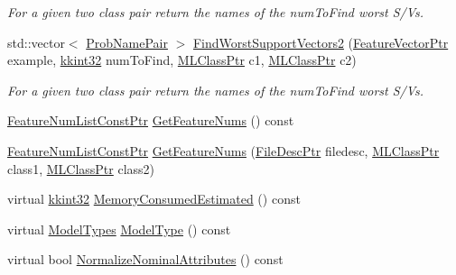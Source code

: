 \begin{DoxyCompactItemize}
\begin{DoxyCompactList}\small\item\em For a given two class pair return the names of the \textquotesingle{}num\+To\+Find\textquotesingle{} worst S/V\textquotesingle{}s. \end{DoxyCompactList}\item 
std\+::vector$<$ \hyperlink{class_k_k_m_l_l_1_1_prob_name_pair}{Prob\+Name\+Pair} $>$ \hyperlink{class_k_k_m_l_l_1_1_model_old_s_v_m_a305e4c27825e5714c3fe4f27b5d65828}{Find\+Worst\+Support\+Vectors2} (\hyperlink{namespace_k_k_m_l_l_a0c5df3d48f45926fbc4fee04f5e3bc04}{Feature\+Vector\+Ptr} example, \hyperlink{namespace_k_k_b_a8fa4952cc84fda1de4bec1fbdd8d5b1b}{kkint32} num\+To\+Find, \hyperlink{namespace_k_k_m_l_l_ac272393853d59e72e8456f14cd6d8c23}{M\+L\+Class\+Ptr} c1, \hyperlink{namespace_k_k_m_l_l_ac272393853d59e72e8456f14cd6d8c23}{M\+L\+Class\+Ptr} c2)
\begin{DoxyCompactList}\small\item\em For a given two class pair return the names of the \textquotesingle{}num\+To\+Find\textquotesingle{} worst S/V\textquotesingle{}s. \end{DoxyCompactList}\item 
\hyperlink{namespace_k_k_m_l_l_a81284b0a14973267260023f9a72da94a}{Feature\+Num\+List\+Const\+Ptr} \hyperlink{class_k_k_m_l_l_1_1_model_old_s_v_m_a29723967e3ebb4aa1f08532b54aaf584}{Get\+Feature\+Nums} () const 
\item 
\hyperlink{namespace_k_k_m_l_l_a81284b0a14973267260023f9a72da94a}{Feature\+Num\+List\+Const\+Ptr} \hyperlink{class_k_k_m_l_l_1_1_model_old_s_v_m_a4743fe0fe455a406ccce94c7ef21f191}{Get\+Feature\+Nums} (\hyperlink{namespace_k_k_m_l_l_aa0d0b6ab4ec18868a399b8455b05d914}{File\+Desc\+Ptr} filedesc, \hyperlink{namespace_k_k_m_l_l_ac272393853d59e72e8456f14cd6d8c23}{M\+L\+Class\+Ptr} class1, \hyperlink{namespace_k_k_m_l_l_ac272393853d59e72e8456f14cd6d8c23}{M\+L\+Class\+Ptr} class2)
\item 
virtual \hyperlink{namespace_k_k_b_a8fa4952cc84fda1de4bec1fbdd8d5b1b}{kkint32} \hyperlink{class_k_k_m_l_l_1_1_model_old_s_v_m_a351b537c1027cf70d1bfdc4249f3556d}{Memory\+Consumed\+Estimated} () const 
\item 
virtual \hyperlink{class_k_k_m_l_l_1_1_model_aeda4060e088c67446ca993eefcecea06}{Model\+Types} \hyperlink{class_k_k_m_l_l_1_1_model_old_s_v_m_a7b16f5aabbf6d26017af4aebcc899f7d}{Model\+Type} () const 
\item 
virtual bool \hyperlink{class_k_k_m_l_l_1_1_model_old_s_v_m_a57a9193bf4d2a26649086d1acfb97840}{Normalize\+Nominal\+Attributes} () const 

\end{DoxyCompactItemize}
